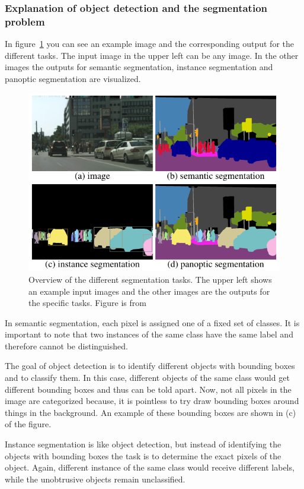\documentclass[a4paper]{scrartcl}
\begin{document}
    \subsubsection{Explanation of object detection and the segmentation problem}
    In figure~\ref{fig:segmentation-tasks} you can see an example image and the corresponding output for the different tasks.
    The input image in the upper left can be any image.
    In the other images the outputs for semantic segmentation, instance segmentation and panoptic segmentation are visualized.

    \begin{figure}[hbtp]
        \centering
        \includegraphics[width=0.5\linewidth]{img/SegmentationTasks}
        \caption[Different Segmentation Tasks]{Overview of the different segmentation tasks.
        The upper left shows an example input images and the other images are the outputs for the specific tasks.
        Figure is from~\cite{kirillov2019panoptic}}
        \label{fig:segmentation-tasks}
    \end{figure}

    In semantic segmentation, each pixel is assigned one of a fixed set of classes.
    It is important to note that two instances of the same class have the same label and therefore cannot be distinguished.

    The goal of object detection is to identify different objects with bounding boxes and to classify them.
    In this case, different objects of the same class would get different bounding boxes and thus can be told apart.
    Now, not all pixels in the image are categorized because, it is pointless to try draw bounding boxes around things in the background.
    An example of these bounding boxes are shown in (c) of the figure.

    Instance segmentation is like object detection, but instead of identifying the objects with bounding boxes the task is to determine the exact pixels of the object.
    Again, different instance of the same class would receive different labels, while the unobtrusive objects remain unclassified.
\end{document}
